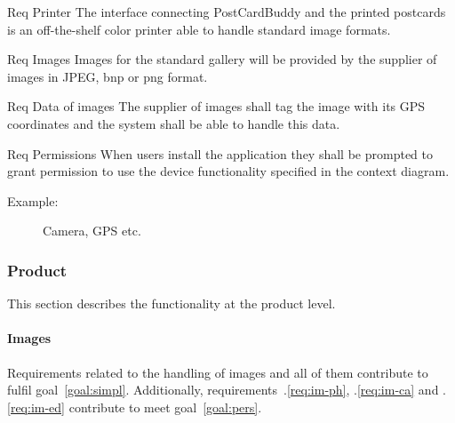 \documentclass[10pt,a4paper]{article}
\begin{document}
\begin {description}
	\item [Req \thesubsubsection {.\theinterf} Printer] The interface connecting PostCardBuddy and the printed postcards is an off-the-shelf color printer able to handle standard image formats.

	\item [Req \thesubsubsection {.\theinterf} Images] Images for the standard gallery will be provided by the supplier of images in JPEG, bnp or png format.

	\item [Req \thesubsubsection {.\theinterf} Data of images] The supplier of images shall tag the image with its GPS coordinates and the system shall be able to handle this data.

	\item [Req \thesubsubsection {.\theinterf} Permissions] When users install the application they shall be prompted to grant permission to use the device functionality specified in the context diagram.  
	\begin{description}
\item[Example:] Camera, GPS etc.
	\end{description} 
\end{description}

\subsubsection{Product}
This section describes the functionality at the product level. 

\newcommand{\rprod}[1]{\refstepcounter{product}\label{#1}}

\paragraph{Images} 
Requirements related to the handling of images and all of them contribute to fulfil goal~\ref{goal:simpl}. Additionally, requirements~\thesubsubsection .\ref{req:im-ph}, \thesubsubsection .\ref{req:im-ca} and \thesubsubsection .\ref{req:im-ed} contribute to meet goal~\ref{goal:pers}.	
\end{document}
